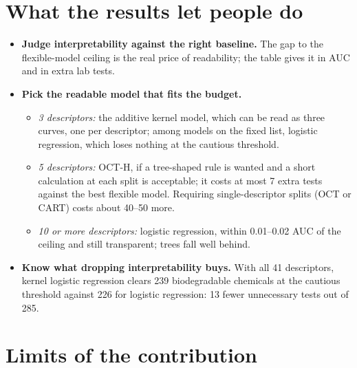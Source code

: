 \documentclass[11pt]{article}
\begin{document}
\section*{What the results let people do}

\begin{itemize}
  \item \textbf{Judge interpretability against the right baseline.} The gap to the flexible-model
        ceiling is the real price of readability; the table gives it in AUC and in extra lab tests.
  \item \textbf{Pick the readable model that fits the budget.}
        \begin{itemize}[itemsep=1pt]
          \item \emph{3 descriptors:} the additive kernel model, which can be read as three curves,
                one per descriptor; among models on the fixed list, logistic regression, which
                loses nothing at the cautious threshold.
          \item \emph{5 descriptors:} OCT-H, if a tree-shaped rule is wanted and a short calculation
                at each split is acceptable; it costs at most 7 extra tests against the best flexible
                model. Requiring single-descriptor splits (OCT or CART) costs about 40--50 more.
          \item \emph{10 or more descriptors:} logistic regression, within 0.01--0.02 AUC of the
                ceiling and still transparent; trees fall well behind.
        \end{itemize}
  \item \textbf{Know what dropping interpretability buys.} With all 41 descriptors, kernel logistic
        regression clears 239 biodegradable chemicals at the cautious threshold against 226 for
        logistic regression: 13 fewer unnecessary tests out of 285.
\end{itemize}

\section*{Limits of the contribution}
\end{document}
